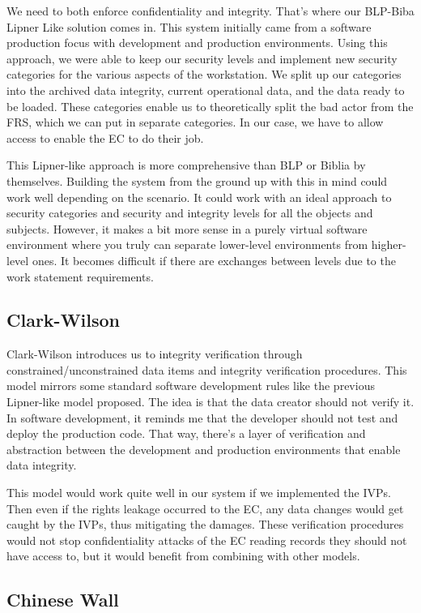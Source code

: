 \documentclass[10pt,journal,compsoc]{IEEEtran}
\begin{document}
We need to both enforce confidentiality and integrity. That's where our BLP-Biba Lipner Like solution comes in. This system initially came from a software production focus with development and production environments. Using this approach, we were able to keep our security levels and implement new security categories for the various aspects of the workstation. We split up our categories into the archived data integrity, current operational data, and the data ready to be loaded. These categories enable us to theoretically split the bad actor from the FRS, which we can put in separate categories. In our case, we have to allow access to enable the EC to do their job. 

This Lipner-like approach is more comprehensive than BLP or Biblia by themselves. Building the system from the ground up with this in mind could work well depending on the scenario. It could work with an ideal approach to security categories and security and integrity levels for all the objects and subjects. However, it makes a bit more sense in a purely virtual software environment where you truly can separate lower-level environments from higher-level ones. It becomes difficult if there are exchanges between levels due to the work statement requirements. 

\subsection{Clark-Wilson}

Clark-Wilson introduces us to integrity verification through constrained/unconstrained data items and integrity verification procedures. This model mirrors some standard software development rules like the previous Lipner-like model proposed. The idea is that the data creator should not verify it. In software development, it reminds me that the developer should not test and deploy the production code. That way, there's a layer of verification and abstraction between the development and production environments that enable data integrity.

This model would work quite well in our system if we implemented the IVPs. Then even if the rights leakage occurred to the EC, any data changes would get caught by the IVPs, thus mitigating the damages. These verification procedures would not stop confidentiality attacks of the EC reading records they should not have access to, but it would benefit from combining with other models. 

\subsection{Chinese Wall}
\end{document}

